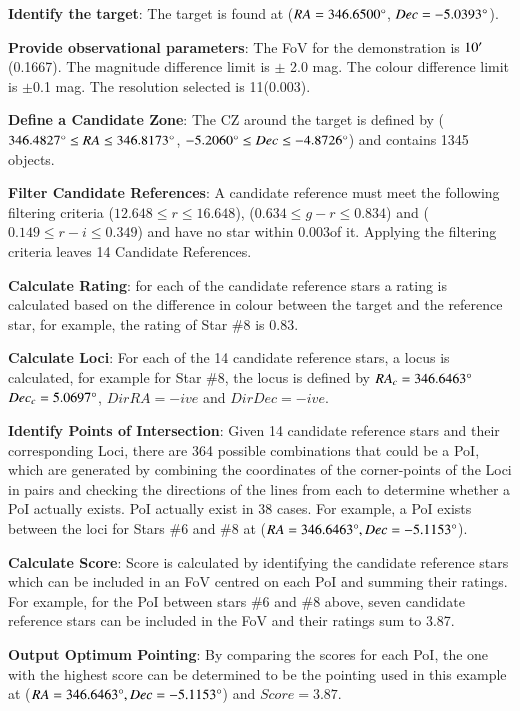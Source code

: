 \documentclass[referee]{aa}
\begin{document}
\textbf{Identify the target}: The target is found at (${RA = 346.6500\degree}$, ${Dec =-5.0393\degree}$).

\textbf{Provide observational parameters}: The FoV for the demonstration is $10^\prime$ (0.1667\textdegree). The magnitude difference limit is $\pm$ 2.0 mag. The colour difference limit is $\pm$0.1 mag. The resolution selected is 11\arcsec (0.003\textdegree).

\textbf{Define a Candidate Zone}: The CZ around the target is defined by (${346.4827\degree \leq RA \leq 346.8173\degree{}}$, ${-5.2060\degree \leq Dec \leq -4.8726\degree}$) and contains 1345 objects.

\textbf{Filter Candidate References}: A candidate reference must meet the following filtering criteria (${12.648 \leq r \leq 16.648}$), (${0.634 \leq g-r \leq 0.834}$) and (${0.149 \leq r-i \leq 0.349}$) and have no star within 0.003\textdegree of it. Applying the filtering criteria leaves 14 Candidate References.

\textbf{Calculate Rating}: for each of the candidate reference stars a rating is calculated based on the difference in colour between the target and the reference star, for example, the rating of Star \#{}8 is 0.83.

\textbf{Calculate Loci}: For each of the 14 candidate reference stars, a locus is calculated, for example for Star \#{}8, the locus is defined by ${RA_c=346.6463\degree{}}$ ${Dec_c=5.0697\degree{}}$, ${DirRA = -ive}$ and ${DirDec = -ive}$.

\textbf{Identify Points of Intersection}: Given 14 candidate reference stars and their corresponding Loci, there are 364 possible combinations that could be a PoI, which are generated by combining the coordinates of the corner-points of the Loci in pairs and checking the directions of the lines from each to determine whether a PoI actually exists.  PoI actually exist in 38 cases. For example, a PoI exists between the loci for Stars \#{}6 and \#{}8 at (${RA=346.6463\degree}, {Dec = -5.1153\degree}$).

\textbf{Calculate Score}: Score is calculated by identifying the candidate reference stars which can be included in an FoV centred on each PoI and summing their ratings. For example, for the PoI between stars \#{}6 and \#{}8 above, seven candidate reference stars can be included in the FoV and their ratings sum to 3.87.

\textbf{Output Optimum Pointing}: By comparing the scores for each PoI, the one with the highest score can be determined to be the pointing used in this example at (${RA=346.6463\degree}, {Dec = -5.1153\degree}$) and ${Score = 3.87}$.
\end{document}
